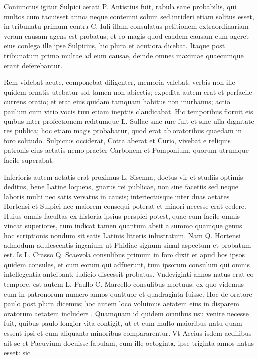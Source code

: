  Coniunctus igitur Sulpici aetati P. Antistius fuit, rabula sane probabilis, qui multos cum tacuisset annos neque contemni solum sed inrideri etiam solitus esset, in tribunatu primum contra C. Iuli illam consulatus petitionem extraordinariam veram causam agens est probatus; et eo magis quod eandem causam cum ageret eius conlega ille ipse Sulpicius, hic plura et acutiora dicebat. Itaque post tribunatum primo multae ad eum causae, deinde omnes maximae quaecumque erant deferebantur.

 Rem videbat acute, componebat diligenter, memoria valebat; verbis non ille quidem ornatis utebatur sed tamen non abiectis; expedita autem erat et perfacile currens oratio; et erat eius quidam tamquam habitus non inurbanus; actio paulum cum vitio vocis tum etiam ineptiis claudicabat. Hic temporibus floruit eis quibus inter profectionem reditumque L. Sullae sine iure fuit et sine ulla dignitate res publica; hoc etiam magis probabatur, quod erat ab oratoribus quaedam in foro solitudo. Sulpicius occiderat, Cotta aberat et Curio, vivebat e reliquis patronis eius aetatis nemo praeter Carbonem et Pomponium, quorum utrumque facile superabat.

 Inferioris autem aetatis erat proximus L. Sisenna, doctus vir et studiis optimis deditus, bene Latine loquens, gnarus rei publicae, non sine facetiis sed neque laboris multi nec satis versatus in causis; interiectusque inter duas aetates Hortensi et Sulpici nec maiorem consequi poterat et minori necesse erat cedere. Huius omnis facultas ex historia ipsius perspici potest, quae cum facile omnis vincat superiores, tum indicat tamen quantum absit a summo quamque genus hoc scriptionis nondum sit satis Latinis litteris inlustratum. Nam Q. Hortensi admodum adulescentis ingenium ut Phidiae signum simul aspectum et probatum est. Is L. Crasso Q. Scaevola consulibus primum in foro dixit et apud hos ipsos quidem consules, et cum eorum qui adfuerunt, tum ipsorum consulum qui omnis intellegentia anteibant, iudicio discessit probatus. Vndeviginti annos natus erat eo tempore, est autem L. Paullo C. Marcello consulibus mortuus: ex quo videmus eum in patronorum numero annos quattuor et quadraginta fuisse. Hoc de oratore paulo post plura dicemus; hoc autem loco voluimus aetatem eius in disparem oratorum aetatem includere . Quamquam id quidem omnibus usu venire necesse fuit, quibus paulo longior vita contigit, ut et cum multo maioribus natu quam essent ipsi et cum aliquanto minoribus compararentur. Vt Accius isdem aedilibus ait se et Pacuvium docuisse fabulam, cum ille octoginta, ipse triginta annos natus esset: sic


